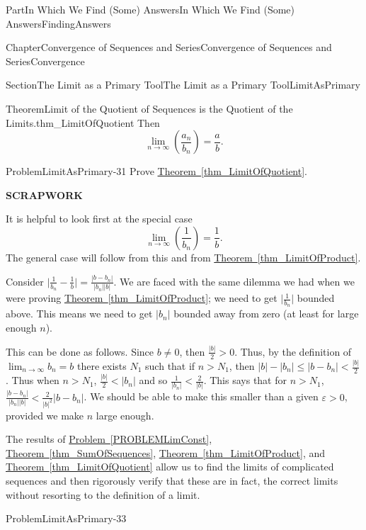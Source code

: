 \documentclass[oneside,10pt,]{book}
\newcommand{\xreffont}{\relax}
\newcommand{\terminology}[1]{\textbf{#1}}
\numberwithin{equation}{part}
\newcommand{\abs}[1]{\left|#1\right|}
\def\limit#1#2#3{{\displaystyle\lim_{#1\rightarrow #2}#3}}
\def\limitt#1#2#3{{\displaystyle\lim_{#1\rightarrow #2}\textstyle #3}}
\newcommand{\eps}{\varepsilon}
\newcommand{\lt}{<}
\begin{document}
\begin{partptx}{Part}{In Which We Find (Some) Answers}{}{In Which We Find (Some) Answers}{}{}{FindingAnswers}
\begin{chapterptx}{Chapter}{Convergence of Sequences and Series}{}{Convergence of Sequences and Series}{}{}{Convergence}
\begin{sectionptx}{Section}{The Limit as a Primary Tool}{}{The Limit as a Primary Tool}{}{}{LimitAsPrimary}
\begin{theorem}{Theorem}{Limit of the Quotient of Sequences is the Quotient of the Limits.}{}{thm_LimitOfQuotient}
Then%
\begin{equation*}
\limit{n}{\infty}{\left(\frac{a_n}{b_n}\right)}=\frac{a}{b}\text{.}
\end{equation*}
%
\end{theorem}
\begin{problem}{Problem}{}{LimitAsPrimary-31}%
Prove \hyperref[thm_LimitOfQuotient]{Theorem~{\xreffont\ref{thm_LimitOfQuotient}}}.%
\par
\terminology{SCRAPWORK}%
\par
It is helpful to look first at the special case%
\begin{equation*}
\limitt{n}{\infty}{\left(\frac{1}{b_n}\right)}=\frac{1}{b}\text{.}
\end{equation*}
The general case will follow from this and from \hyperref[thm_LimitOfProduct]{Theorem~{\xreffont\ref{thm_LimitOfProduct}}}.%
\par
Consider \(\big|\frac{1}{b_n}-\frac{1}{b}\big|=\frac{|b-b_n|}{|b_n||b|}\). We are faced with the same dilemma we had when we were proving \hyperref[thm_LimitOfProduct]{Theorem~{\xreffont\ref{thm_LimitOfProduct}}}; we need to get \(\big|\frac{1}{b_n}\big|\) bounded above. This means we need to get \(\abs{b_n}\) bounded away from zero (at least for large enough \(n\)).%
\par
This can be done as follows. Since \(b\neq 0\), then \(\frac{|b|}{2}>0\). Thus, by the definition of \(\limit{n}{\infty}{b_n}=b\) there exists \(N_1\) such that if \(n>N_1\), then \(\abs{b}-\abs{b_n}\leq\big|b-b_n\big|\lt \frac{\abs{b}}{2}\). Thus when \(n>N_1\), \(\frac{\abs{b}}{2}\lt \abs{b_n}\) and so \(\frac{1}{\abs{b_n}}\lt \frac{2}{\abs{b}}\). This says that for \(n>N_1\), \(\frac{\abs{b-b_n}}{\abs{b_n}\abs{b}}\lt \frac{2}{\abs{b}^2}\abs{b-b_n}\). We should be able to make this smaller than a given \(\eps>0\), provided we make \(n\) large enough.%
\end{problem}
The results of \hyperref[PROBLEMLimConst]{Problem~{\xreffont\ref{PROBLEMLimConst}}}, \hyperref[thm_SumOfSequences]{Theorem~{\xreffont\ref{thm_SumOfSequences}}}, \hyperref[thm_LimitOfProduct]{Theorem~{\xreffont\ref{thm_LimitOfProduct}}}, and \hyperref[thm_LimitOfQuotient]{Theorem~{\xreffont\ref{thm_LimitOfQuotient}}} allow us to find the limits of complicated sequences and then rigorously verify that these are in fact, the correct limits without resorting to the definition of a limit.%
\begin{problem}{Problem}{}{LimitAsPrimary-33}%
\begin{enumerate}[font=\bfseries,label=(\alph*),ref=\alph*]%

\end{enumerate}
\end{problem}
\end{sectionptx}
\end{chapterptx}
\end{partptx}
\end{document}
